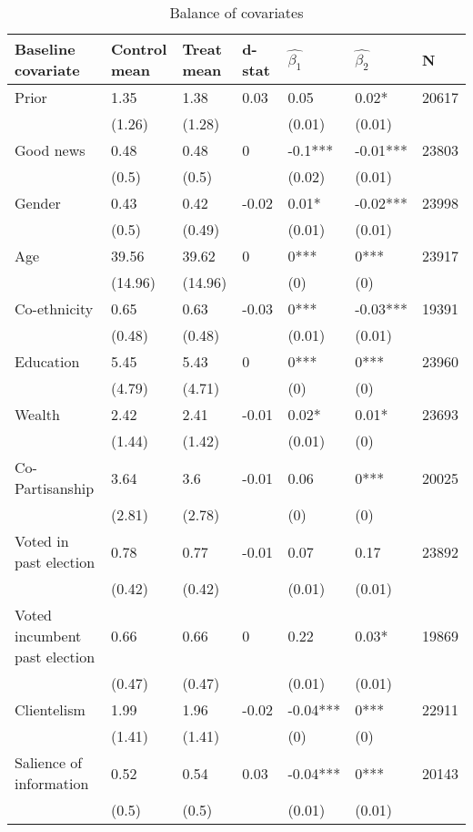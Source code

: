 \begin{table}[h!]
\caption{Balance of covariates}
\centering
\footnotesize
\begin{tabular}{lllllll}
  \hline
Baseline covariate & Control mean  & Treat mean & d-stat & $\hat{\beta_1}$ & $\hat{\beta_2}$ & N \\ 
  \hline
Prior & 1.35 & 1.38 & 0.03 & 0.05 & 0.02* & 20617 \\ 
   & (1.26) & (1.28) &  & (0.01) & (0.01) &  \\ 
  Good news & 0.48 & 0.48 & 0 & -0.1*** & -0.01*** & 23803 \\ 
   & (0.5) & (0.5) &  & (0.02) & (0.01) &  \\ 
  Gender & 0.43 & 0.42 & -0.02 & 0.01* & -0.02*** & 23998 \\ 
   & (0.5) & (0.49) &  & (0.01) & (0.01) &  \\ 
  Age & 39.56 & 39.62 & 0 & 0*** & 0*** & 23917 \\ 
   & (14.96) & (14.96) &  & (0) & (0) &  \\ 
  Co-ethnicity & 0.65 & 0.63 & -0.03 & 0*** & -0.03*** & 19391 \\ 
   & (0.48) & (0.48) &  & (0.01) & (0.01) &  \\ 
  Education & 5.45 & 5.43 & 0 & 0*** & 0*** & 23960 \\ 
   & (4.79) & (4.71) &  & (0) & (0) &  \\ 
  Wealth & 2.42 & 2.41 & -0.01 & 0.02* & 0.01* & 23693 \\ 
   & (1.44) & (1.42) &  & (0.01) & (0) &  \\ 
  Co-Partisanship & 3.64 & 3.6 & -0.01 & 0.06 & 0*** & 20025 \\ 
   & (2.81) & (2.78) &  & (0) & (0) &  \\ 
  Voted in past election & 0.78 & 0.77 & -0.01 & 0.07 & 0.17 & 23892 \\ 
   & (0.42) & (0.42) &  & (0.01) & (0.01) &  \\ 
  Voted incumbent past election & 0.66 & 0.66 & 0 & 0.22 & 0.03* & 19869 \\ 
   & (0.47) & (0.47) &  & (0.01) & (0.01) &  \\ 
  Clientelism & 1.99 & 1.96 & -0.02 & -0.04*** & 0*** & 22911 \\ 
   & (1.41) & (1.41) &  & (0) & (0) &  \\ 
  Salience of information & 0.52 & 0.54 & 0.03 & -0.04*** & 0*** & 20143 \\ 
   & (0.5) & (0.5) &  & (0.01) & (0.01) &  \\ 

\end{tabular}
\end{table}
